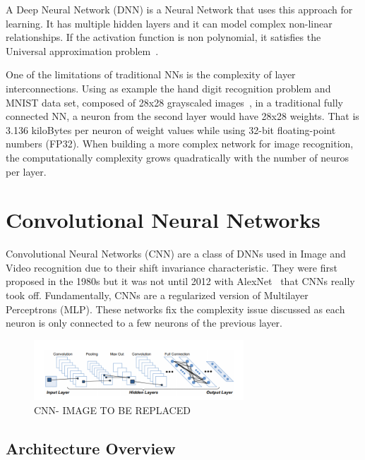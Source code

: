 A Deep Neural Network (DNN) is a Neural Network that uses this approach for
learning. It has multiple hidden layers and it can model complex non-linear
relationships. If the activation function is non polynomial, it satisfies the
Universal approximation problem~\cite{approximation:problem}.

One of the limitations of traditional NNs is the complexity of layer
interconnections. Using as example the hand digit recognition problem and MNIST
data set, composed of 28x28 grayscaled images~\cite{mnist:digits}, in a
traditional fully connected NN, a neuron from the second layer would have 28x28
weights. That is 3.136 kiloBytes per neuron of weight values while using 32-bit
floating-point numbers (FP32). When building a more complex network for image
recognition, the computationally complexity grows quadratically with the number
of neuros per layer.


\section{Convolutional Neural Networks}
\label{section:subcnn}

Convolutional Neural Networks (CNN) are a class of DNNs used in Image and Video
recognition due to their shift invariance characteristic. They were first
proposed in the 1980s but it was not until 2012 with AlexNet~\cite{alexnet} that
CNNs really took off. Fundamentally, CNNs are a regularized version of
Multilayer Perceptrons (MLP). These networks fix the complexity issue discussed
as each neuron is only connected to a few neurons of the previous layer.
 

 \begin{figure}[!htbp]
    \centering
    \includegraphics[width=0.7\textwidth]{Figures/convolutionlayer.png}
    \caption{CNN- IMAGE TO BE REPLACED}
    \label{CNNl}
\end{figure} 

 \subsection{Architecture Overview}
 \label{section:Aoverview}

